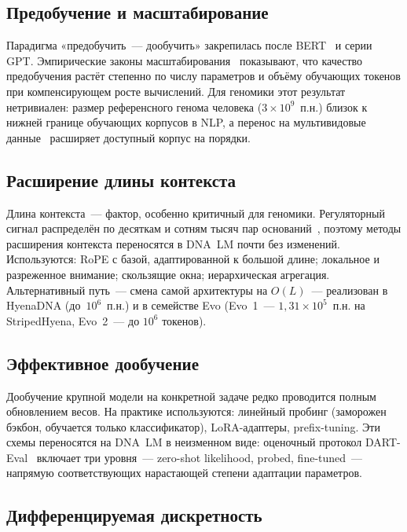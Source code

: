 \subsection{Предобучение и масштабирование}

Парадигма «предобучить~--- дообучить» закрепилась после
BERT~\cite{devlinBERTPretrainingDeep2019} и серии GPT. Эмпирические
законы масштабирования~\cite{kaplanScalingLawsNeural2020,
hoffmannTrainingComputeOptimal2022} показывают, что качество
предобучения растёт степенно по числу параметров и объёму обучающих
токенов при компенсирующем росте вычислений. Для геномики этот
результат нетривиален: размер референсного генома человека
($3 \times 10^9$~п.н.) близок к нижней границе обучающих корпусов в
NLP, а перенос на мультивидовые
данные~\cite{dalla-torreNucleotideTransformerBuilding2025} расширяет
доступный корпус на порядки.

\subsection{Расширение длины контекста}

Длина контекста~--- фактор, особенно критичный для геномики.
Регуляторный сигнал распределён по десяткам и сотням тысяч пар
оснований~\cite{schoenfelderLongrangeEnhancerPromoter2019}, поэтому
методы расширения контекста переносятся в DNA~LM почти без
изменений. Используются: RoPE с базой,
адаптированной к большой длине; локальное и разреженное внимание;
скользящие окна; иерархическая агрегация. Альтернативный путь~---
смена самой архитектуры на $O(L)$~--- реализован в HyenaDNA
(до~$10^6$~п.н.) и в семействе Evo (Evo~1~--- $1{,}31 \times 10^5$~п.н.
на StripedHyena, Evo~2~--- до $10^6$ токенов).

\subsection{Эффективное дообучение}

Дообучение крупной модели на конкретной задаче редко проводится
полным обновлением весов. На практике используются: линейный пробинг
(заморожен бэкбон, обучается только классификатор), LoRA-адаптеры,
prefix-tuning. Эти схемы переносятся на DNA~LM в неизменном виде:
оценочный протокол DART-Eval~\cite{patel2025dartevalcomprehensivednalanguage}
включает три уровня~--- zero-shot likelihood, probed, fine-tuned~---
напрямую соответствующих нарастающей степени адаптации параметров.

\subsection{Дифференцируемая дискретность}

